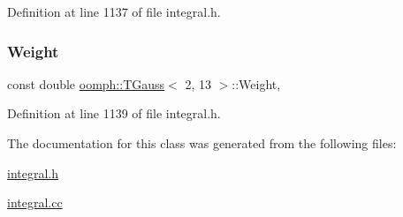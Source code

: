 Definition at line 1137 of file integral.\+h.

\mbox{\label{classoomph_1_1TGauss_3_012_00_0113_01_4_af8c0d8ded8fe2912308157ee2f72c924}} 
\subsubsection{\texorpdfstring{Weight}{Weight}}
{\footnotesize\ttfamily const double \hyperlink{classoomph_1_1TGauss}{oomph\+::\+T\+Gauss}$<$ 2, 13 $>$\+::Weight\hspace{0.3cm}{\ttfamily [static]}, {\ttfamily [private]}}



Definition at line 1139 of file integral.\+h.



The documentation for this class was generated from the following files\+:\begin{DoxyCompactItemize}
\item 
\hyperlink{integral_8h}{integral.\+h}\item 
\hyperlink{integral_8cc}{integral.\+cc}\end{DoxyCompactItemize}
